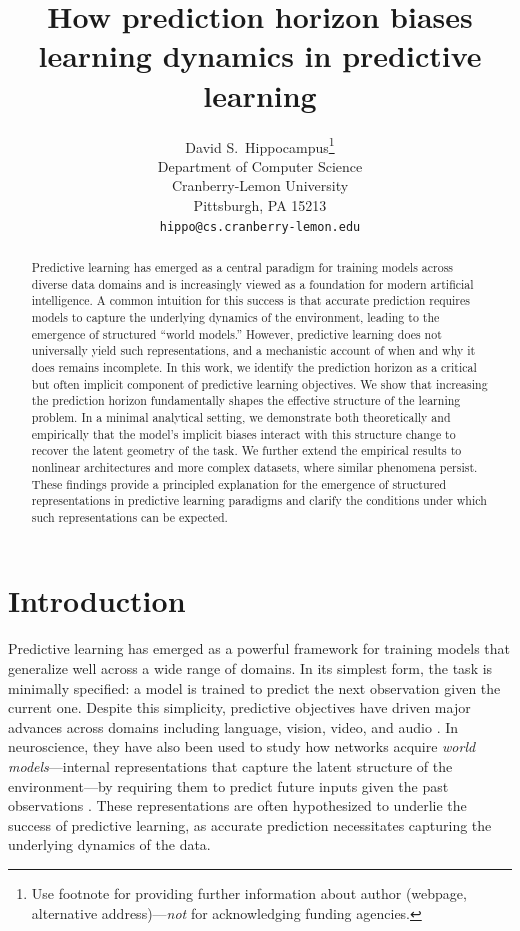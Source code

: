 \documentclass{article}
\title{How prediction horizon biases learning dynamics in predictive learning}
\author{%
  David S.~Hippocampus\thanks{Use footnote for providing further information
    about author (webpage, alternative address)---\emph{not} for acknowledging
    funding agencies.} \\
  Department of Computer Science\\
  Cranberry-Lemon University\\
  Pittsburgh, PA 15213 \\
  \texttt{hippo@cs.cranberry-lemon.edu} \\
}
\begin{document}
\maketitle


\begin{abstract}
  Predictive learning has emerged as a central paradigm for training models across diverse data domains and is increasingly viewed as a foundation for modern artificial intelligence. A common intuition for this success is that accurate prediction requires models to capture the underlying dynamics of the environment, leading to the emergence of structured “world models.” However, predictive learning does not universally yield such representations, and a mechanistic account of when and why it does remains incomplete. In this work, we identify the prediction horizon as a critical but often implicit component of predictive learning objectives. We show that increasing the prediction horizon fundamentally shapes the effective structure of the learning problem. In a minimal analytical setting, we demonstrate both theoretically and empirically that the model’s implicit biases interact with this structure change to recover the latent geometry of the task. We further extend the empirical results to nonlinear architectures and more complex datasets, where similar phenomena persist. These findings provide a principled explanation for the emergence of structured representations in predictive learning paradigms and clarify the conditions under which such representations can be expected.
\end{abstract}

\section{Introduction}

Predictive learning has emerged as a powerful framework for training models that generalize well across a wide range of domains. In its simplest form, the task is minimally specified: a model is trained to predict the next observation given the current one. Despite this simplicity, predictive objectives have driven major advances across domains including language, vision, video, and audio \citep{brown2020language,chen2020generative,sun2019videobert,baevski2020wav2vec2}. In neuroscience, they have also been used to study how networks acquire \emph{world models}—internal representations that capture the latent structure of the environment—by requiring them to predict future inputs given the past observations \citep{recanatesi2021predictive, stachenfeld2017hippocampus, levenstein2024sequential}. These representations are often hypothesized to underlie the success of predictive learning, as accurate prediction necessitates capturing the underlying dynamics of the data.
\end{document}
